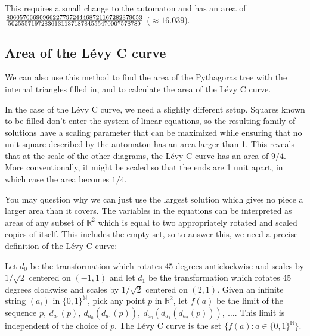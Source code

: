 \documentclass{article}
\newcommand{\bounding}{
\draw[tsty] (-2.5,1) -- (-1.5,0) -- (2.5,0) -- (3.5,1) -- (3.5,2.5) -- (2,4) -- (-1,4) -- (-2.5, 2.5) -- cycle;
}
\newcommand{\subt}[2]{
    \begin{scope}[yshift=1cm,rotate=45,scale=0.7071]
        #1
    \end{scope}
    \begin{scope}[xshift=0.5cm,yshift=1.5cm,rotate=-45,scale=0.7071]
        #2
    \end{scope}
}
\newcommand{\dup}[1]{\subt{#1}{#1}}
\newcommand{\gtree}[3]{
	#2
	\ifthenelse{#1<2}{
		#3
	}{
		\dup{\gtree{\the\numexpr#1-1}{#2}{#3}}
	}
}
\newcommand{\filledtree}[1]{
\gtree{#1}{
	\fill[tsty] (0,0) -- (1,0) -- (1,1) -- (0.5,1.5) -- (0,1) -- cycle;
}{\bounding}
}
\newcommand{\depth}{5}%
\begin{document}

This requires a small change to the automaton and has an area of $80605706690966227797244468721167282379053\over 5025557197283613113718784555470007578789$ ($\approx 16.039$).

\subsection{Area of the Lévy C curve}
We can also use this method to find the area of the Pythagoras tree with the internal triangles filled in, and to calculate the area of the Lévy C curve.

In the case of the Lévy C curve, we need a slightly different setup. Squares known to be filled don't enter the system of linear equations, so the resulting family of solutions have a scaling parameter that can be maximized while ensuring that no unit square described by the automaton has an area larger than 1. This reveals that at the scale of the other diagrams, the Lévy C curve has an area of $9/4$. More conventionally, it might be scaled so that the ends are 1 unit apart, in which case the area becomes $1/4$.


You may question why we can just use the largest solution which gives no piece a larger area than it covers. The variables in the equations can be interpreted as areas of any subset of $\mathbb{R}^2$ which is equal to two appropriately rotated and scaled copies of itself. This includes the empty set, so to answer this, we need a precise definition of the Lévy C curve:

Let $d_0$ be the transformation which rotates 45 degrees anticlockwise and scales by $1/\sqrt{2}$ centered on $(-1,1)$
and let $d_1$ be the transformation which rotates 45 degrees clockwise and scales by $1/\sqrt{2}$ centered on $(2,1)$.
Given an infinite string $(a_i)$ in $\{0,1\}^\mathbb{N}$, pick any point $p$ in $\mathbb{R}^2$, let $f(a)$ be the limit of the sequence $p,\ d_{a_0}(p),\ d_{a_0}(d_{a_1}(p)),\ d_{a_0}(d_{a_1}(d_{a_2}(p))),\ \dots$. This limit is independent of the choice of $p$. The Lévy C curve is the set  $\{f(a) : a \in \{0,1\}^\mathbb{N}\}$.
\end{document}
